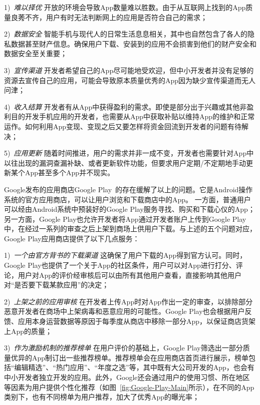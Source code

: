 1)\ \emph{难以择优} \quad
开放的环境会导致App数量难以胜数。由于从互联网上找到的App质量良莠不齐，用户有时无法判断网上的应用是否符合自己的需求；

2)\ \emph{数据安全} \quad
智能手机与现代人的日常生活息息相关，其中也自然包含了各人的隐私数据甚至财产信息。确保用户下载、安装到的应用不会损害到他们的财产安全和数据安全至关重要；

3)\ \emph{宣传渠道} \quad
开发者希望自己的App尽可能地受欢迎，但中小开发者并没有足够的资源去宣传自己的应用，可能会导致原本质量优秀的App因为缺少宣传渠道而无人问津；

4)\ \emph{收入结算} \quad
开发者有从App中获得盈利的需求。即使是部分出于兴趣或其他非盈利目的开发手机应用的开发者，也需要从App中获取补贴以维持App的维护和正常运作。如何利用App变现、变现之后又要怎样将资金回流到开发者的问题有待解决；

5)\ \emph{应用更新} \quad
随着时间推进，用户的需求并非一成不变，开发者也需要针对App中以往出现的漏洞查漏补缺、或者更新软件功能，但要求用户定期/不定期地手动更新某个App甚至多个App并不现实。

Google发布的应用商店Google Play~\cite{GooglePlay}的存在缓解了以上的问题。它是Android操作系统的官方应用商店，可以让用户浏览和下载商店中的App。
一方面，普通用户可以经由Android系统中预装好的Google Play服务寻找、购买和下载心仪的App；另一方面，Google Play也允许开发者将App通过开发者账户上传到Google Play中，在经过一系列的审查之后上架到商场上供用户下载。与上述的五个问题对应，Google Play应用商店提供了以下几点服务：

1)\ \emph{一个由官方背书的下载渠道} \quad
这确保了用户下载的App得到官方认可。同时，Google Play也提供了一个关于App的社区条件，用户可以对App进行打分、评论，用户对App的评价经审核后可以由所有其他用户查看，直接影响其他用户对``是否要下载某款应用''的决定；

2)\ \emph{上架之前的应用审核} \quad
在开发者上传App时对App作出一定的审查，以排除部分恶意开发者在商场中上架病毒和恶意应用的可能性。Google Play也会根据用户反馈、应用本身运营数据等原因于每季度从商店中移除一部分App，以保证商店货架上App的质量；

3)\ \emph{作为激励机制的推荐榜单} \quad
在用户评价的基础上，Google Play筛选出一部分质量优异的App制订出一些推荐榜单。推荐榜单会在应用商店首页进行展示，榜单包括``编辑精选''、``热门应用''、``年度之选''等，其中既有大公司开发的App，也会有中小开发者独立开发的应用。此外，Google还会通过用户的使用习惯、所在地区等因素为用户提供个性化推荐（如图~\ref{fig:Google-Play-Main}所示），在不同的App类别下，也有不同榜单为用户推荐，加大了优秀App的曝光率；

